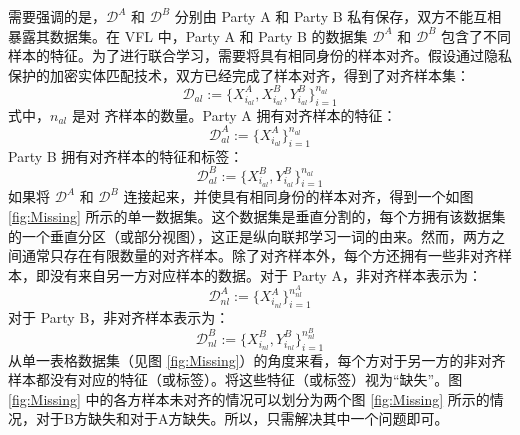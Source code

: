 需要强调的是，$\mathcal{D}^A$ 和 $\mathcal{D}^B$ 分别由 Party A 和 Party B 私有保存，双方不能互相暴露其数据集。在 VFL 中，Party A 和 Party B 的数据集 $\mathcal{D}^A$ 和 $\mathcal{D}^B$ 包含了不同样本的特征。为了进行联合学习，需要将具有相同身份的样本对齐。假设通过隐私保护的加密实体匹配技术，双方已经完成了样本对齐，得到了对齐样本集：
\begin{equation}
	\mathcal{D}_{al} := \{X^A_{i_{al}}, X^B_{i_{al}}, Y^B_{i_{al}}\}_{i=1}^{n_{al}}
\end{equation}
式中，$n_{al}$ 是对 齐样本的数量。Party A 拥有对齐样本的特征：
\begin{equation}
	\mathcal{D}^A_{al} := \{X^A_{i_{al}}\}_{i=1}^{n_{al}}
\end{equation}
Party B 拥有对齐样本的特征和标签：
\begin{equation}
	\mathcal{D}^B_{al} := \{X^B_{i_{al}}, Y^B_{i_{al}}\}_{i=1}^{n_{al}}
\end{equation}
如果将 $\mathcal{D}^A$ 和 $\mathcal{D}^B$ 连接起来，并使具有相同身份的样本对齐，得到一个如图 \ref{fig:Missing} 所示的单一数据集。这个数据集是垂直分割的，每个方拥有该数据集的一个垂直分区（或部分视图），这正是纵向联邦学习一词的由来。然而，两方之间通常只存在有限数量的对齐样本。除了对齐样本外，每个方还拥有一些非对齐样本，即没有来自另一方对应样本的数据。对于 Party A，非对齐样本表示为：
\begin{equation}
	\mathcal{D}^A_{nl} := \{X^A_{i_{nl}}\}_{i=1}^{n^A_{nl}}
\end{equation}
对于 Party B，非对齐样本表示为：
\begin{equation}
	\mathcal{D}^B_{nl} := \{X^B_{i_{nl}}, Y^B_{i_{nl}}\}_{i=1}^{n^B_{nl}}
\end{equation}
从单一表格数据集（见图 \ref{fig:Missing}）的角度来看，每个方对于另一方的非对齐样本都没有对应的特征（或标签）。将这些特征（或标签）视为“缺失”。图 \ref{fig:Missing} 中的各方样本未对齐的情况可以划分为两个图 \ref{fig:Missing} 所示的情况，对于B方缺失和对于A方缺失。所以，只需解决其中一个问题即可。

